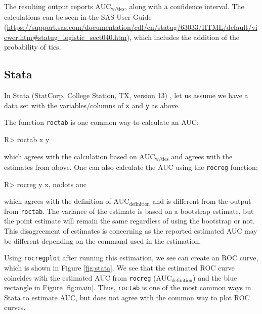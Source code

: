 \documentclass[article]{jss}
\begin{document}
The resulting output reports \(\text{AUC}_{\text{w/ties}}\), along with
a confidence interval. The calculations can be seen in the SAS User
Guide
(\url{https://support.sas.com/documentation/cdl/en/statug/63033/HTML/default/viewer.htm\#statug_logistic_sect040.htm}),
which includes the addition of the probability of ties.

\hypertarget{stata}{%
\subsection{Stata}\label{stata}}

In Stata (StatCorp, College Station, TX, version 13) \citep{stata}, let
us assume we have a data set with the variables/columns of \texttt{x}
and \texttt{y} as above.

The function \texttt{roctab} is one common way to calculate an AUC:

\begin{CodeChunk}

\begin{CodeInput}
R> roctab x y
\end{CodeInput}
\end{CodeChunk}

which agrees with the calculation based on
\(\text{AUC}_{\text{w/ties}}\) and agrees with the estimates from above.
One can also calculate the AUC using the \texttt{rocreg} function:

\begin{CodeChunk}

\begin{CodeInput}
R> rocreg y x, nodots auc
\end{CodeInput}
\end{CodeChunk}

which agrees with the definition of \(\text{AUC}_{\text{definition}}\)
and is different from the output from \texttt{roctab}. The variance of
the estimate is based on a bootstrap estimate, but the point estimate
will remain the same regardless of using the bootstrap or not. This
disagreement of estimates is concerning as the reported estimated AUC
may be different depending on the command used in the estimation.

Using \texttt{rocregplot} after running this estimation, we see can
create an ROC curve, which is shown in Figure \ref{fig:stata}. We see
that the estimated ROC curve coincides with the estimated AUC from
\texttt{rocreg} (\(\text{AUC}_{\text{definition}}\)) and the blue
rectangle in Figure \ref{fig:main}. Thus, \texttt{roctab} is one of the
most common ways in Stata to estimate AUC, but does not agree with the
common way to plot ROC curves.
\end{document}
